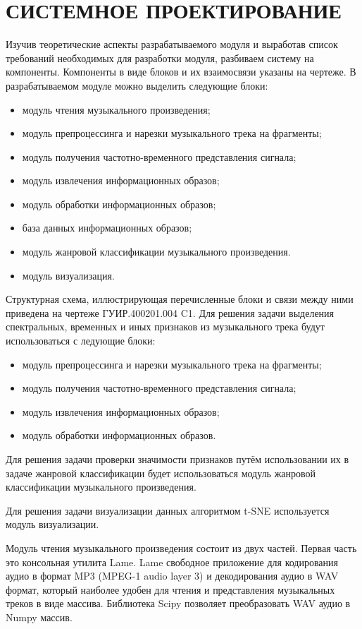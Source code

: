 \section{СИСТЕМНОЕ ПРОЕКТИРОВАНИЕ}
\label{sec:sys}


Изучив теоретические аспекты разрабатываемого модуля и выработав список требований необходимых для разработки модуля, разбиваем систему на компоненты. Компоненты в виде блоков и их взаимосвязи указаны на чертеже.
В разрабатываемом модуле можно выделить следующие блоки:
\begin{itemize}
\item модуль чтения музыкального произведения;
\item модуль препроцессинга и нарезки музыкального трека на фрагменты;
\item модуль получения частотно-временного представления сигнала;
\item модуль извлечения информационных образов;
\item модуль обработки информационных образов;
\item база данных информационных образов;
\item модуль жанровой классификации музыкального произведения.
\item модуль визуализация.
\end{itemize}
Структурная схема, иллюстрирующая перечисленные блоки и связи между ними приведена на чертеже ГУИР.400201.004 C1.
Для решения задачи выделения спектральных, временных и иных признаков из музыкального трека будут использоваться с
ледующие блоки:

\begin{itemize}
\item модуль препроцессинга и нарезки музыкального трека на фрагменты;
\item модуль получения частотно-временного представления сигнала;
\item модуль извлечения информационных образов;
\item модуль обработки информационных образов.
\end{itemize}

Для решения задачи проверки значимости признаков путём использовании их в задаче жанровой классификации будет использоваться модуль жанровой классификации музыкального произведения.

Для решения задачи визуализации данных алгоритмом t-SNE используется модуль визуализации.

Модуль чтения музыкального произведения состоит из двух частей. Первая часть это консольная утилита Lame. Lame свободное приложение для кодирования аудио в формат MP3 (MPEG-1 audio layer 3) и декодирования аудио в WAV формат, который наиболее удобен для чтения и представления музыкальных треков в виде массива. Библиотека Scipy позволяет преобразовать WAV аудио в Numpy массив. 

